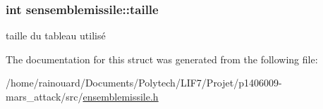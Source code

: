 \subsubsection[{\texorpdfstring{taille}{taille}}]{\setlength{\rightskip}{0pt plus 5cm}int sensemblemissile\+::taille}\hypertarget{structsensemblemissile_a5886bfe353020c03ef6beace07674f7c}{}\label{structsensemblemissile_a5886bfe353020c03ef6beace07674f7c}
taille du tableau utilisé 

The documentation for this struct was generated from the following file\+:\begin{DoxyCompactItemize}
\item 
/home/rainouard/\+Documents/\+Polytech/\+L\+I\+F7/\+Projet/p1406009-\/mars\+\_\+attack/src/\hyperlink{ensemblemissile_8h}{ensemblemissile.\+h}\end{DoxyCompactItemize}
